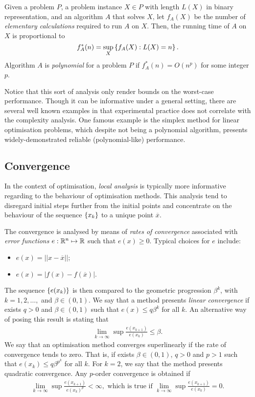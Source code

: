\begin{definition}
    Given a problem $P$, a problem instance $X \in P$ with length $L(X)$ in binary representation, and an algorithm $A$ that solves $X$, let $f_A(X)$ be the number of \emph{elementary calculations} required to run $A$ on $X$. Then, the running time of $A$ on $X$ is proportional to $$f^*_A(n) = \sup_X\left\{ f_A(X) : L(X) = n \right \}.$$ Algorithm $A$ is \emph{polynomial} for a problem $P$ if $f^*_A(n) = O(n^p)$ for some integer $p$.
\end{definition}

Notice that this sort of analysis only render bounds on the worst-case performance. Though it can be informative under a general setting, there are several well known examples in that experimental practice does not correlate with the complexity analysis. One famous example is the simplex method for linear optimisation problems, which despite not being a polynomial algorithm, presents widely-demonstrated reliable (polynomial-like) performance. 

\subsection{Convergence}

In the context of optimisation, \emph{local analysis} is typically more informative regarding to the behaviour of optimisation methods. This analysis tend to disregard initial steps further from the initial points and concentrate on the behaviour of the sequence $\left\{ x_k \right \}$ to a unique point $\overline{x}$.

The convergence is analysed by means of \emph{rates of convergence} associated with \emph{error functions} $e: \mathbb{R}^n \mapsto \mathbb{R}$ such that $e(x) \geq 0$. Typical choices for $e$ include:
\begin{itemize}
\item $e(x) = ||x - \overline{x}||$;
\item $e(x) = |f(x) - f(\overline{x})|$.
\end{itemize}

The sequence $\left\{ e(x_k) \right \}$ is then compared to the geometric progression $\beta^k$, with $k=1,2,\dots,$ and $\beta \in (0,1)$. We say that a method presents \emph{linear convergence} if exists $q > 0$ and $\beta \in (0,1)$ such that $e(x) \leq q\beta^k$ for all $k$. An alternative way of posing this result is stating that
%
\begin{align*}
	\lim_{k\rightarrow\infty} \sup \frac{e(x_{k+1})}{e(x_k)} \leq \beta.
\end{align*}
%
We say that an optimisation method converges superlinearly if the rate of convergence tends to zero. That is, if exists $\beta \in (0,1)$, $q > 0$ and $p > 1$ such that $e(x_k) \leq q\beta^{p^k}$ for all $k$. For $k=2$, we say that the method presents quadratic convergence. Any $p$-order convergence is obtained if 
%
\begin{align*}
	\lim_{k\rightarrow\infty} \sup \frac{e(x_{k+1})}{e(x_k)^p} < \infty, \text{ which is true if }
\lim_{k\rightarrow\infty} \sup \frac{e(x_{k+1})}{e(x_k)} = 0	.
\end{align*}

